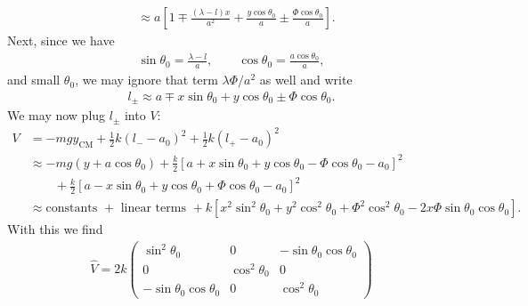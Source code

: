 \documentclass{article}
\theoremstyle{definition}
\newcommand{\f}[2]{\frac{#1}{#2}}
\newcommand{\lb}{\left[}
\newcommand{\rb}{\right]}
\begin{document}
\begin{enumerate}[label=(\alph*)]
\begin{align*}
	&\approx a\lb 1 \mp \f{(\lambda-l) x}{a^2}  + \f{y\cos\theta_0}{a} \pm \f{\Phi\cos\theta_0}{a} \rb.
	\end{align*}
	Next, since we have
	\begin{align*}
	\sin\theta_0 = \f{\lambda-l}{a}, \quad\quad \cos\theta_0 = \f{a\cos\theta_0}{a},
	\end{align*}
	and small $\theta_0$, we may ignore that term $\lambda\Phi/a^2$ as well and write
	\begin{align*}
	l_\pm \approx a \mp x \sin\theta_0 + y\cos\theta_0 \pm \Phi \cos\theta_0.
	\end{align*}
	We may now plug $l_\pm$ into $V$:
	\begin{align*}
	V 
	&= -mgy_\text{CM} + \f{1}{2}k(l_- -a_0)^2 + \f{1}{2}k(l_+-a_0)^2\\
	&\approx -mg(y+a\cos\theta_0) + \f{k}{2}\lb a + x \sin\theta_0 + y\cos\theta_0 - \Phi \cos\theta_0 -a_0 \rb^2\\
	&\quad\quad + \f{k}{2}\lb a - x \sin\theta_0 + y\cos\theta_0 + \Phi \cos\theta_0 - a_0\rb^2\\
	&\approx \text{constants } + \text{ linear terms } + k\lb x^2\sin^2\theta_0 + y^2\cos^2\theta_0
	+ \Phi^2\cos^2\theta_0 - 2x\Phi \sin\theta_0\cos\theta_0\rb.
	\end{align*}
	With this we find 
	\begin{align*}
	\boxed{\hat V = 
	2k\begin{pmatrix}
	\sin^2\theta_0 & 0 & -\sin\theta_0 \cos\theta_0 \\
	0 & \cos^2\theta_0 & 0  \\
	-\sin\theta_0 \cos\theta_0 & 0 & \cos^2\theta_0
	\end{pmatrix}}
	\end{align*}
	
	
	
	
	
	
	

\end{enumerate}
\end{document}
